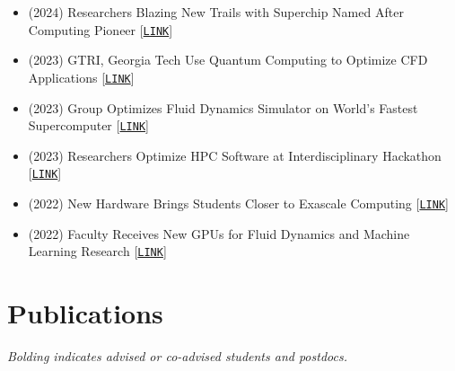 \begin{itemize}
    \item (2024) Researchers Blazing New Trails with Superchip Named After Computing Pioneer [\href{https://www.cc.gatech.edu/news/researchers-blazing-new-trails-superchip-named-after-computing-pioneer}{\tt LINK}] 

    \item (2023) GTRI, Georgia Tech Use Quantum Computing to Optimize CFD Applications
 [\href{https://gtri.gatech.edu/newsroom/gtri-georgia-tech-use-quantum-computing-optimize-cfd-applications}{\tt LINK}]

    \item (2023) Group Optimizes Fluid Dynamics Simulator on World's Fastest Supercomputer [\href{https://www.cc.gatech.edu/news/group-optimizes-fluid-dynamics-simulator-worlds-fastest-supercomputer}{\tt LINK}]

    \item (2023) Researchers Optimize HPC Software at Interdisciplinary Hackathon
[\href{https://www.cc.gatech.edu/news/researchers-optimize-hpc-software-interdisciplinary-hackathon}{\tt LINK}]

    \item (2022) New Hardware Brings Students Closer to Exascale Computing [\href{https://www.cc.gatech.edu/news/new-hardware-brings-students-closer-exascale-computing}{\tt LINK}]

    \item (2022) Faculty Receives New GPUs for Fluid Dynamics and Machine Learning Research [\href{https://www.cc.gatech.edu/news/faculty-receives-new-gpus-fluid-dynamics-and-machine-learning-research}{\tt LINK}]
\end{itemize}

\section{Publications}

\begin{center}
    \textit{Bolding indicates advised or co-advised students and postdocs.}
\end{center}

\nocite{*}

\newrefcontext[labelprefix=U]
\printbibliography[type=unpublished,title={Preprints},resetnumbers=true,heading=subbibnumbered]

\newrefcontext[labelprefix=P]
\printbibliography[title={Archival, heavily refereed papers},resetnumbers=true,filter=fullpapers,heading=subbibnumbered]

